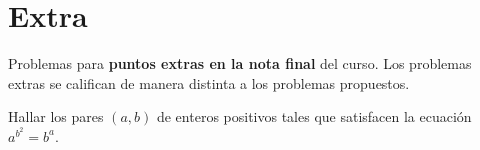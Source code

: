 \section{Extra}

Problemas para \textbf{puntos extras en la nota final} del curso.
Los problemas extras se califican de manera distinta a los problemas propuestos.

\begin{problem}
    Hallar los pares $(a,b)$ de enteros positivos tales que satisfacen la ecuación $a^{b^2} = b^a$.
\end{problem}